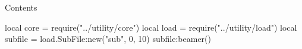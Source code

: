\documentclass[10pt]{beamer}
\date{\today}
\title{}
\author{}
\begin{document}
\maketitle

\begin{frame}{Contents}
    \tableofcontents
\end{frame}

\begin{luacode*}
    local core = require("../utility/core")
    local load = require("../utility/load")
    local subfile = load.SubFile:new("sub", 0, 10)
    subfile:beamer()
\end{luacode*}



\end{document}
